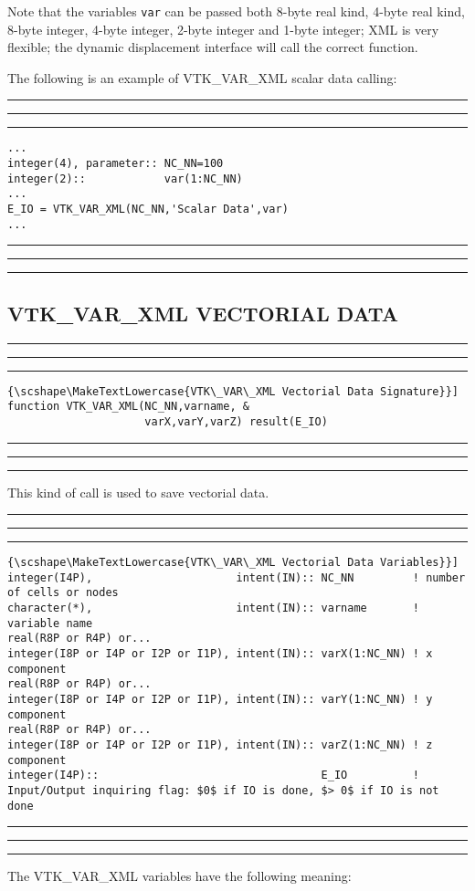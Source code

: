 \documentclass[pagesize=pdftex,fontsize=10pt,paper=a4,oneside]{scrbook}
\DeclareRobustCommand{\MarginNote}[1]{\marginpar{%
\slshape\footnotesize%
\parindent=0pt\lineskip=0pt\lineskiplimit=0pt%
\tolerance=2000\hyphenpenalty=300\exhyphenpenalty=300%
\doublehyphendemerits=100000\finalhyphendemerits=\doublehyphendemerits%
\raggedright\hspace{0pt}#1}}
\newenvironment{boxred}[1]%
               {%
                \noindent\hspace*{-0.025\textwidth}%
                \color{Maroon}%
                \rule[-5.8pt]{0.6pt}{6pt}\hspace*{-0.6pt}\rule{1.05\textwidth}{0.6pt}\hspace*{-0.6pt}\rule[-5.8pt]{0.6pt}{6pt}%
                \color{black}%
                \vspace*{0.6pt}\MarginNote{\color{Maroon}{#1}}%
               }%
               {%
                \noindent\hspace*{-0.025\textwidth}%
                \color{Maroon}%
                \rule[0pt]{0.6pt}{6pt}\hspace*{-0.6pt}\rule{1.05\textwidth}{0.6pt}\hspace*{-0.6pt}\rule[0pt]{0.6pt}{6pt}%
                \color{black}%
                \vspace*{2mm}%
               }
\DeclareRobustCommand{\MaiuscolettoBS}[1]{\textls[80]{\scshape\MakeTextLowercase{#1}}}
\begin{document}
Note that the variables \texttt{var} can be passed both 8-byte real kind, 4-byte real kind, 8-byte integer, 4-byte integer, 2-byte integer and 1-byte integer; XML is very flexible; the dynamic displacement interface will call the correct function.

The following is an example of VTK\_VAR\_XML scalar data calling:

\begin{boxred}{VTK\_VAR\_XML Scalar Data Calling}
\begin{verbatim}
...
integer(4), parameter:: NC_NN=100
integer(2)::            var(1:NC_NN)
...
E_IO = VTK_VAR_XML(NC_NN,'Scalar Data',var)
...
\end{verbatim}
\end{boxred}

\subsection{VTK\_VAR\_XML VECTORIAL DATA}

\begin{boxred}{}
\begin{lstlisting}[style=signature,title=\color{Maroon}\MaiuscolettoBS{VTK\_VAR\_XML Vectorial Data Signature}]
function VTK_VAR_XML(NC_NN,varname, &
                     varX,varY,varZ) result(E_IO)
\end{lstlisting}
\end{boxred}

This kind of call is used to save vectorial data.

\begin{boxred}{}
\begin{lstlisting}[style=variables,title=\color{Maroon}\MaiuscolettoBS{VTK\_VAR\_XML Vectorial Data Variables}]
integer(I4P),                      intent(IN):: NC_NN         ! number of cells or nodes
character(*),                      intent(IN):: varname       ! variable name
real(R8P or R4P) or...
integer(I8P or I4P or I2P or I1P), intent(IN):: varX(1:NC_NN) ! x component
real(R8P or R4P) or...
integer(I8P or I4P or I2P or I1P), intent(IN):: varY(1:NC_NN) ! y component
real(R8P or R4P) or...
integer(I8P or I4P or I2P or I1P), intent(IN):: varZ(1:NC_NN) ! z component
integer(I4P)::                                  E_IO          ! Input/Output inquiring flag: $0$ if IO is done, $> 0$ if IO is not done
\end{lstlisting}
\end{boxred}

The VTK\_VAR\_XML variables have the following meaning:
\end{document}
